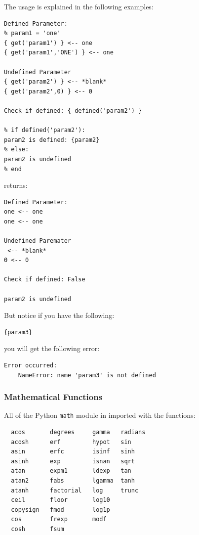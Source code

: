 {The usage is explained in the following examples:

\begin{verbatim}
Defined Parameter:
% param1 = 'one'
{ get('param1') } <-- one
{ get('param1','ONE') } <-- one

Undefined Parameter
{ get('param2') } <-- *blank*
{ get('param2',0) } <-- 0

Check if defined: { defined('param2') }

% if defined('param2'):
param2 is defined: {param2}
% else:
param2 is undefined
% end
\end{verbatim}

returns:

\begin{verbatim}
Defined Parameter:
one <-- one
one <-- one

Undefined Paremater
 <-- *blank*
0 <-- 0

Check if defined: False

param2 is undefined
\end{verbatim}

But notice if you have the following:

\begin{verbatim}
{param3}
\end{verbatim}

you will get the following error:

\begin{verbatim}
Error occurred:
    NameError: name 'param3' is not defined
\end{verbatim}

\subsubsection{Mathematical Functions}\label{interfaces:mathematical-functions}

All of the Python \texttt{math} module in imported with the functions:

\begin{verbatim}
  acos       degrees     gamma   radians  
  acosh      erf         hypot   sin      
  asin       erfc        isinf   sinh      
  asinh      exp         isnan   sqrt      
  atan       expm1       ldexp   tan       
  atan2      fabs        lgamma  tanh      
  atanh      factorial   log     trunc     
  ceil       floor       log10   
  copysign   fmod        log1p   
  cos        frexp       modf             
  cosh       fsum                               
\end{verbatim}

}
